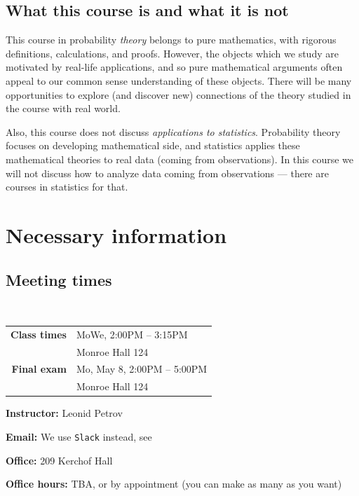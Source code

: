 \documentclass[oneside,11pt]{amsart}
\begin{document}
\subsection*{What this course is and what it is not}

This course in probability \emph{theory} 
belongs to pure mathematics, with rigorous definitions, calculations, 
and proofs. However, the objects which we study 
are motivated by real-life applications, and so pure mathematical 
arguments often appeal to our common sense understanding of these objects. 
There will be many opportunities to explore (and discover new) connections
of the theory studied in the course with real world.

Also, this course does not discuss \emph{applications to statistics}. Probability theory focuses on 
developing mathematical side, and statistics applies these mathematical theories
to real data (coming from observations). In this course we will not discuss how to analyze data coming from observations
--- there are courses in statistics for that.

\section{Necessary information}

\subsection{Meeting times}{\ }\\

\begin{tabular}{|r|l|}
	\hline
	\textbf{Class times}  & MoWe, 2:00PM -- 3:15PM
                       \\  & Monroe Hall 124
                       \\ \hline
	\textbf{Final exam}   & Mo, May 8, 2:00PM -- 5:00PM
                       \\  & Monroe Hall 124
                       \\ \hline
\end{tabular}
\hspace{10pt}\parbox{.45\textwidth}
{

	\textbf{Instructor:} Leonid Petrov

	\textbf{Email:} We use \texttt{Slack} instead, see 

	\textbf{Office:} 209 Kerchof Hall

	\textbf{Office hours:} TBA,
	or by appointment (you can make as many as you want)
}
\end{document}

